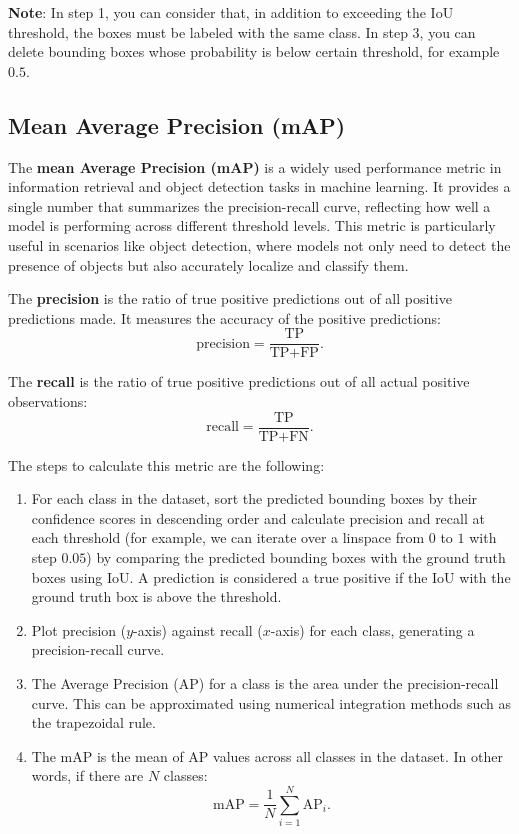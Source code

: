 \textbf{Note}: In step 1, you can consider that, in addition to exceeding the IoU threshold, the boxes must be labeled with the same class. In step 3, you can delete bounding boxes whose probability is below certain threshold, for example $0.5$.



\subsection{Mean Average Precision (mAP)}

The \textbf{mean Average Precision (mAP)} is a widely used performance metric in information retrieval and object detection tasks in machine learning. It provides a single number that summarizes the precision-recall curve, reflecting how well a model is performing across different threshold levels. This metric is particularly useful in scenarios like object detection, where models not only need to detect the presence of objects but also accurately localize and classify them. 

The \textbf{precision} is the ratio of true positive predictions out of all positive predictions made. It measures the accuracy of the positive predictions:
$$\text{precision} = \dfrac{\text{TP}}{\text{TP}+\text{FP}}.$$

The \textbf{recall} is the ratio of true positive predictions out of all actual positive observations:
$$\text{recall} = \dfrac{\text{TP}}{\text{TP}+\text{FN}}.$$

The steps to calculate this metric are the following:
\begin{enumerate}
\item For each class in the dataset, sort the predicted bounding boxes by their confidence scores in descending order and calculate precision and recall at each threshold (for example, we can iterate over a linspace from $0$ to $1$ with step $0.05$) by comparing the predicted bounding boxes with the ground truth boxes using IoU. A prediction is considered a true positive if the IoU with the ground truth box is above the threshold.
\item Plot precision ($y$-axis) against recall ($x$-axis) for each class, generating a precision-recall curve.
\item The Average Precision (AP) for a class is the area under the precision-recall curve. This can be approximated using numerical integration methods such as the trapezoidal rule.
\item The mAP is the mean of AP values across all classes in the dataset. In other words, if there are $N$ classes:
$$\text{mAP} = \dfrac{1}{N}\sum_{i=1}^N\text{AP}_i.$$
\end{enumerate}

